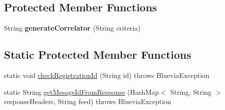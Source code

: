 \subsection*{Protected Member Functions}
\begin{DoxyCompactItemize}
\item 
\hypertarget{classcom_1_1bluevia_1_1messagery_1_1mo_1_1client_1_1BVMoClient_a83d2e113d3573437e80cadf8a1ac961d}{
String {\bfseries generateCorrelator} (String criteria)}
\label{classcom_1_1bluevia_1_1messagery_1_1mo_1_1client_1_1BVMoClient_a83d2e113d3573437e80cadf8a1ac961d}

\end{DoxyCompactItemize}
\subsection*{Static Protected Member Functions}
\begin{DoxyCompactItemize}
\item 
static void \hyperlink{classcom_1_1bluevia_1_1messagery_1_1mo_1_1client_1_1BVMoClient_a2677c61987a0d6fc9c58655d05b5b4ef}{checkRegistrationId} (String id)  throws BlueviaException 
\item 
static String \hyperlink{classcom_1_1bluevia_1_1messagery_1_1mo_1_1client_1_1BVMoClient_a1a3ff8e37aa8f250121e76e99d44b400}{getMesageIdFromResponse} (HashMap$<$ String, String $>$ responseHeaders, String feed)  throws BlueviaException
\end{DoxyCompactItemize}
